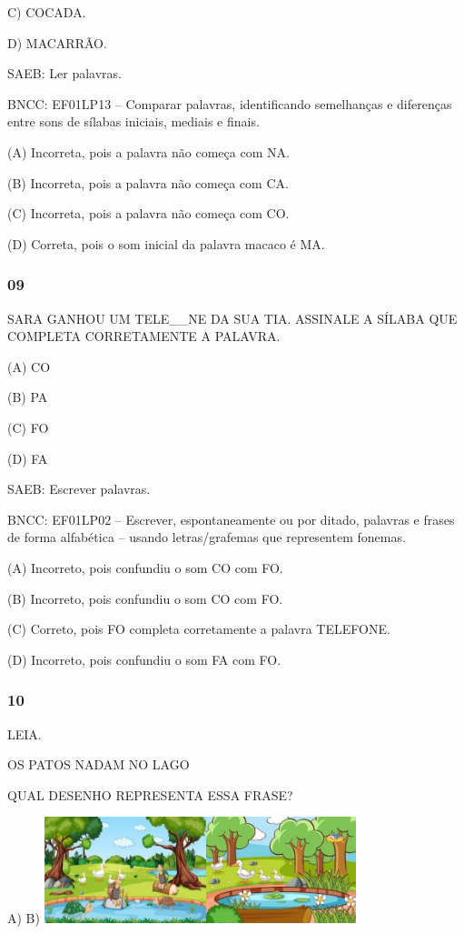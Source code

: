C) COCADA.

D) MACARRÃO.

SAEB: Ler palavras.

BNCC: EF01LP13 -- Comparar palavras, identificando semelhanças e diferenças entre sons de sílabas iniciais, mediais e finais.

(A) Incorreta, pois a palavra não começa com NA.

(B) Incorreta, pois a palavra não começa com CA.

(C) Incorreta, pois a palavra não começa com CO.

(D) Correta, pois o som inicial da palavra macaco é MA.\protect\hypertarget{_heading=h.z3c8l2ojus6u}{}{}

\subsubsection{09}\label{section-81}

SARA GANHOU UM TELE__NE DA SUA TIA. ASSINALE A SÍLABA QUE COMPLETA CORRETAMENTE A PALAVRA.

(A) CO

(B) PA

(C) FO

(D) FA

SAEB: Escrever palavras.

BNCC: EF01LP02 -- Escrever, espontaneamente ou por ditado,
palavras e frases de forma alfabética -- usando letras/grafemas que
representem fonemas.

(A) Incorreto, pois confundiu o som CO com FO.

(B) Incorreto, pois confundiu o som CO com FO.

(C) Correto, pois FO completa corretamente a palavra TELEFONE.

(D) Incorreto, pois confundiu o som FA com FO.
\protect\hypertarget{_heading=h.z3c8l2ojus6u}{}{}

\subsubsection{10}\label{section-82}

LEIA.

OS PATOS NADAM NO LAGO

QUAL DESENHO REPRESENTA ESSA FRASE?

A) B)
\includegraphics[width=1.85903in,height=1.21806in]{media/image250.jpg}\includegraphics[width=1.71806in,height=1.21875in]{media/image251.jpg}


